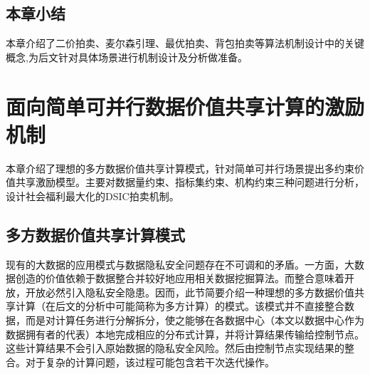 \documentclass[promaster]{thesis-uestc}
\begin{document}
%
%
%
%

\section{本章小结}
本章介绍了二价拍卖、麦尔森引理、最优拍卖、背包拍卖等算法机制设计中的关键概念,为后文针对具体场景进行机制设计及分析做准备。

\chapter{面向简单可并行数据价值共享计算的激励机制}
本章介绍了理想的多方数据价值共享计算模式，针对简单可并行场景提出多约束价值共享激励模型。主要对数据量约束、指标集约束、机构约束三种问题进行分析，设计社会福利最大化的DSIC拍卖机制。

\section{多方数据价值共享计算模式}
现有的大数据的应用模式与数据隐私安全问题存在不可调和的矛盾。一方面，大数据创造的价值依赖于数据整合并较好地应用相关数据挖掘算法。而整合意味着开放，开放必然引入隐私安全隐患。因而，此节简要介绍一种理想的多方数据价值共享计算（在后文的分析中可能简称为多方计算）的模式。该模式并不直接整合数据，而是对计算任务进行分解拆分，使之能够在各数据中心（本文以数据中心作为数据拥有者的代表）本地完成相应的分布式计算，并将计算结果传输给控制节点。这些计算结果不会引入原始数据的隐私安全风险。然后由控制节点实现结果的整合。对于复杂的计算问题，该过程可能包含若干次迭代操作。
\end{document}
